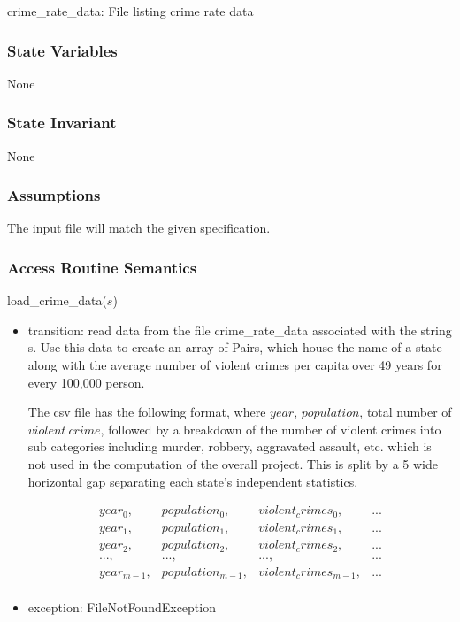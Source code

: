 \documentclass[12pt]{article}
\begin{document}
crime\_rate\_data: File listing crime rate data

\subsubsection* {State Variables}

None

\subsubsection* {State Invariant}

None

\subsubsection* {Assumptions}

The input file will match the given specification.

\subsubsection* {Access Routine Semantics}

\noindent load\_crime\_data($s$)
\begin{itemize}
\item transition: read data from the file crime\_rate\_data associated with the string s.
  Use this data to create an array of Pairs, which house the name of a state along with
  the average number of violent crimes per capita over 49 years for every 100,000 person.

  The csv file has the following format, where $year$, $population$, total number of $violent\ crime$,
  followed by a breakdown of the number of violent crimes into sub categories including murder, robbery, 
  aggravated assault, etc. which is not used in the computation of the overall project. This is split by a 5 wide
  horizontal gap separating each state's independent statistics. 

  \begin{equation}
    \begin{array}{cccc}
      year_0, & population_0, & violent_crimes_0, & . . . \\
      year_1, & population_1, & violent_crimes_1, & . . . \\
      year_2, & population_2, & violent_crimes_2, & . . . 
      \\
      ..., & ..., & ..., & ...
      \\
      year_{m-1}, & population_{m-1}, & violent_crimes_{m-1}, & . . . \\
    \end{array}
  \end{equation}

\item exception: FileNotFoundException
\end{itemize}
\newpage
\end{document}
